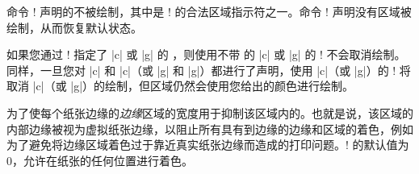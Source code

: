 命令 \!\nobackgroundcolor! 声明的\bground{}不被绘制，其中是 \!\backgroundcolor! 的合法区域指示符之一。命令 \!\resetbackgroundcolor! 声明没有区域被绘制，从而恢复默认状态。


如果您通过 \!\backgroundcolor! 指定了 |c| 或 |g| 的 \bgpaint{}，则使用不带  的 |c| 或 |g| 的 \!\nobackgroundcolor! 不会取消绘制。同样，一旦您对 |c| 和 |c|（或 |g| 和 |g|）都进行了声明，使用 |c|（或 |g|）的 \!\nobackgroundcolor! 将取消 |c|（或 |g|）的绘制，但区域仍然会使用您给出的颜色进行绘制。
% 
% 
% 



为了使每个纸张边缘的\emph{边缘}区域的宽度用于抑制该区域内的\bgpaint{}。也就是说，该区域的内部边缘被视为虚拟纸张边缘，以阻止所有具有\bginfext{}到边缘的边缘和区域的着色，例如为了避免将边缘区域着色过于靠近真实纸张边缘而造成的打印问题。\!\pagerim! 的默认值为 0，允许在纸张的任何位置进行着色。
% 